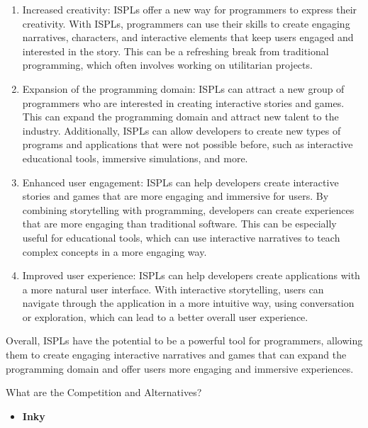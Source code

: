  \begin{enumerate}
                 \item Increased creativity: ISPLs offer a new way for programmers to express their creativity. With ISPLs, programmers can use their skills to create engaging narratives, characters, and interactive elements that keep users engaged and interested in the story. This can be a refreshing break from traditional programming, which often involves working on utilitarian projects.
                 \item Expansion of the programming domain: ISPLs can attract a new group of programmers who are interested in creating interactive stories and games. This can expand the programming domain and attract new talent to the industry. Additionally, ISPLs can allow developers to create new types of programs and applications that were not possible before, such as interactive educational tools, immersive simulations, and more.
                 \item Enhanced user engagement: ISPLs can help developers create interactive stories and games that are more engaging and immersive for users. By combining storytelling with programming, developers can create experiences that are more engaging than traditional software. This can be especially useful for educational tools, which can use interactive narratives to teach complex concepts in a more engaging way.
                 \item Improved user experience: ISPLs can help developers create applications with a more natural user interface. With interactive storytelling, users can navigate through the application in a more intuitive way, using conversation or exploration, which can lead to a better overall user experience.
 \end{enumerate}
 Overall, ISPLs have the potential to be a powerful tool for programmers, allowing them to create engaging interactive narratives and games that can expand the programming domain and offer users more engaging and immersive experiences.

\noindent What are the Competition and Alternatives?

 \begin{itemize}
                \item \textbf{Inky}
 \end{itemize}
 
